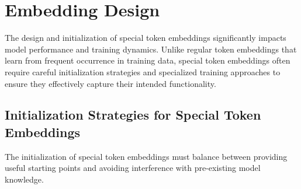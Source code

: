 
\section{Embedding Design}

The design and initialization of special token embeddings significantly impacts model performance and training dynamics. Unlike regular token embeddings that learn from frequent occurrence in training data, special token embeddings often require careful initialization strategies and specialized training approaches to ensure they effectively capture their intended functionality.

\subsection{Initialization Strategies for Special Token Embeddings}

The initialization of special token embeddings must balance between providing useful starting points and avoiding interference with pre-existing model knowledge.


